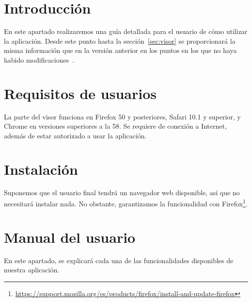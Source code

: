 
\section{Introducción}
En este apartado realizaremos una guía detallada para el usuario de cómo utilizar la aplicación. Desde este punto hasta la sección~\ref{sec:visor} se proporcionará la misma información que en la versión anterior en los puntos en los que no haya habido modificaciones~\cite{github:alberto-viewer}.

\section{Requisitos de usuarios}
La parte del visor funciona en Firefox 50 y posteriores, Safari 10.1 y superior, y Chrome en versiones superiores a la 58.
Se requiere de conexión a Internet, además de estar autorizado a usar la aplicación.

\section{Instalación}
Suponemos que el usuario final tendrá un navegador web disponible, así que no necesitará instalar nada. No obstante, garantizamos la funcionalidad con Firefox\footnote{\url{https://support.mozilla.org/es/products/firefox/install-and-update-firefox}}.

\section{Manual del usuario}
En este apartado, se explicará cada una de las funcionalidades disponibles de nuestra aplicación.

